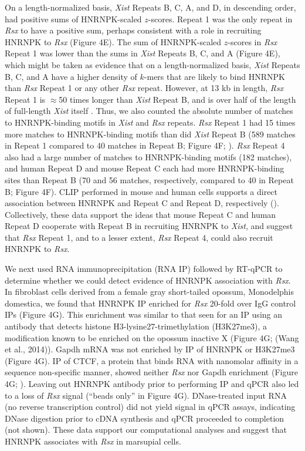 On a length-normalized basis, \emph{Xist} Repeats B, C, A, and D, in descending order, had positive sums of HNRNPK-scaled $z$-scores. Repeat 1 was the only repeat in \emph{Rsx} to have a positive sum, perhaps consistent with a role in recruiting HNRNPK to \emph{Rsx} (Figure 4E). The sum of HNRNPK-scaled $z$-scores in \emph{Rsx} Repeat 1 was lower than the sums in \emph{Xist} Repeats B, C, and A (Figure 4E), which might be taken as evidence that on a length-normalized basis, \emph{Xist} Repeats B, C, and A have a higher density of $k$-mers that are likely to bind HNRNPK than \emph{Rsx} Repeat 1 or any other \emph{Rsx} repeat. However, at 13 kb in length, \emph{Rsx} Repeat 1 is $\approx$50 times longer than \emph{Xist} Repeat B, and is over half of the length of full-length \emph{Xist} itself \cite{Brockdorff10TheNucleus.,Brown10TheNucleus.,Johnson2018AdaptationGenome}. Thus, we also counted the absolute number of matches to HNRNPK-binding motifs in \emph{Xist} and \emph{Rsx} repeats. \emph{Rsx} Repeat 1 had 15 times more matches to HNRNPK-binding motifs than did \emph{Xist} Repeat B (589 matches in Repeat 1 compared to 40 matches in Repeat B; Figure 4F; \cite{Bailey2009MEMESearching}). \emph{Rsx} Repeat 4 also had a large number of matches to HNRNPK-binding motifs (182 matches), and human Repeat D and mouse Repeat C each had more HNRNPK-binding sites than Repeat B (70 and 56 matches, respectively, compared to 40 in Repeat B; Figure 4F). CLIP performed in mouse and human cells supports a direct association between HNRNPK and Repeat C and Repeat D, respectively (\cite{Cirillo2016QuantitativeEditor,VanNostrand2016RobusteCLIP}). Collectively, these data support the ideas that mouse Repeat C and human Repeat D cooperate with Repeat B in recruiting HNRNPK to \emph{Xist}, and suggest that \emph{Rsx} Repeat 1, and to a lesser extent, \emph{Rsx} Repeat 4, could also recruit HNRNPK to \emph{Rsx}. 

We next used RNA immunoprecipitation (RNA IP) followed by RT-qPCR to determine whether we could detect evidence of HNRNPK association with \emph{Rsx}. In fibroblast cells derived from a female gray short-tailed opossum, Monodelphis domestica, we found that HNRNPK IP enriched for \emph{Rsx} 20-fold over IgG control IPs (Figure 4G). This enrichment was similar to that seen for an IP using an antibody that detects histone H3-lysine27-trimethylation (H3K27me3), a modification known to be enriched on the opossum inactive X (Figure 4G; (Wang et al., 2014)). Gapdh mRNA was not enriched by IP of HNRNPK or H3K27me3 (Figure 4G). IP of CTCF, a protein that binds RNA with nanomolar affinity in a sequence non-specific manner, showed neither \emph{Rsx} nor Gapdh enrichment (Figure 4G; \cite{Kung2015Locus-specificCTCF}). Leaving out HNRNPK antibody prior to performing IP and qPCR also led to a loss of \emph{Rsx} signal (“beads only” in Figure 4G). DNase-treated input RNA (no reverse transcription control) did not yield signal in qPCR assays, indicating DNase digestion prior to cDNA synthesis and qPCR proceeded to completion (not shown). These data support our computational analyses and suggest that HNRNPK associates with \emph{Rsx} in marsupial cells.

